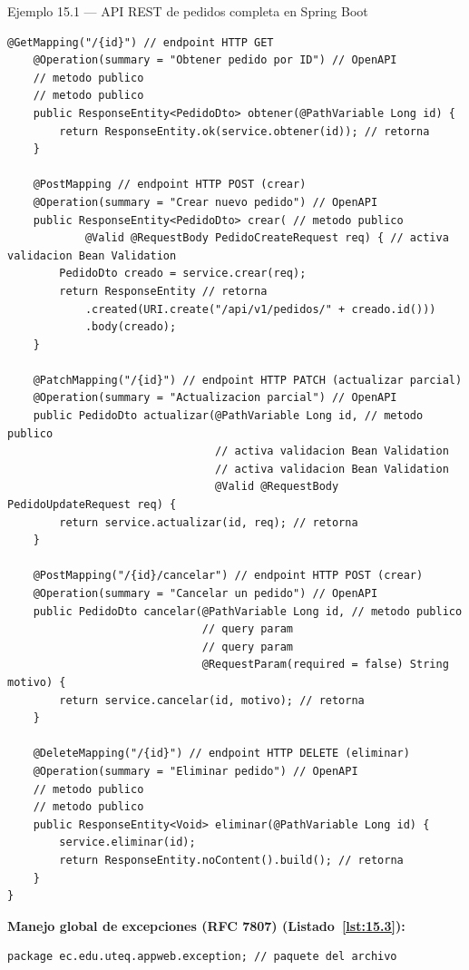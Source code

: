 \begin{cajaejemplo}{Ejemplo 15.1 --- API REST de pedidos completa en Spring Boot}
\begin{lstlisting}[style=java,caption={PedidoController.java},label=lst:15.2]
    @GetMapping("/{id}") // endpoint HTTP GET
    @Operation(summary = "Obtener pedido por ID") // OpenAPI
    // metodo publico
    // metodo publico
    public ResponseEntity<PedidoDto> obtener(@PathVariable Long id) {
        return ResponseEntity.ok(service.obtener(id)); // retorna
    }

    @PostMapping // endpoint HTTP POST (crear)
    @Operation(summary = "Crear nuevo pedido") // OpenAPI
    public ResponseEntity<PedidoDto> crear( // metodo publico
            @Valid @RequestBody PedidoCreateRequest req) { // activa validacion Bean Validation
        PedidoDto creado = service.crear(req);
        return ResponseEntity // retorna
            .created(URI.create("/api/v1/pedidos/" + creado.id()))
            .body(creado);
    }

    @PatchMapping("/{id}") // endpoint HTTP PATCH (actualizar parcial)
    @Operation(summary = "Actualizacion parcial") // OpenAPI
    public PedidoDto actualizar(@PathVariable Long id, // metodo publico
                                // activa validacion Bean Validation
                                // activa validacion Bean Validation
                                @Valid @RequestBody PedidoUpdateRequest req) {
        return service.actualizar(id, req); // retorna
    }

    @PostMapping("/{id}/cancelar") // endpoint HTTP POST (crear)
    @Operation(summary = "Cancelar un pedido") // OpenAPI
    public PedidoDto cancelar(@PathVariable Long id, // metodo publico
                              // query param
                              // query param
                              @RequestParam(required = false) String motivo) {
        return service.cancelar(id, motivo); // retorna
    }

    @DeleteMapping("/{id}") // endpoint HTTP DELETE (eliminar)
    @Operation(summary = "Eliminar pedido") // OpenAPI
    // metodo publico
    // metodo publico
    public ResponseEntity<Void> eliminar(@PathVariable Long id) {
        service.eliminar(id);
        return ResponseEntity.noContent().build(); // retorna
    }
}
\end{lstlisting}

\textbf{Manejo global de excepciones (RFC 7807) (Listado~\ref{lst:15.3}):}
\begin{lstlisting}[style=java,caption={GlobalExceptionHandler.java},label=lst:15.3]
package ec.edu.uteq.appweb.exception; // paquete del archivo


\end{lstlisting}
\end{cajaejemplo}
